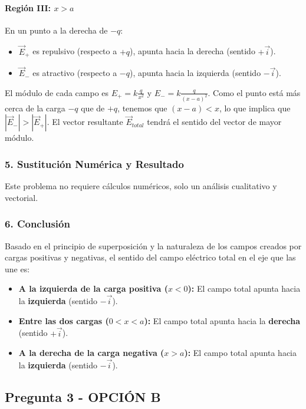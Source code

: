 \paragraph*{Región III: $x > a$}
En un punto a la derecha de $-q$:
\begin{itemize}
    \item $\vec{E}_+$ es repulsivo (respecto a $+q$), apunta hacia la derecha (sentido $+\vec{i}$).
    \item $\vec{E}_-$ es atractivo (respecto a $-q$), apunta hacia la izquierda (sentido $-\vec{i}$).
\end{itemize}
El módulo de cada campo es $E_+ = k\frac{q}{x^2}$ y $E_- = k\frac{q}{(x-a)^2}$. Como el punto está más cerca de la carga $-q$ que de $+q$, tenemos que $(x-a) < x$, lo que implica que $|\vec{E}_-| > |\vec{E}_+|$. El vector resultante $\vec{E}_{total}$ tendrá el sentido del vector de mayor módulo.

\subsubsection*{5. Sustitución Numérica y Resultado}
Este problema no requiere cálculos numéricos, solo un análisis cualitativo y vectorial.

\subsubsection*{6. Conclusión}
\begin{cajaconclusion}
Basado en el principio de superposición y la naturaleza de los campos creados por cargas positivas y negativas, el sentido del campo eléctrico total en el eje que las une es:
\begin{itemize}
    \item \textbf{A la izquierda de la carga positiva ($x<0$):} El campo total apunta hacia la \textbf{izquierda} (sentido $-\vec{i}$).
    \item \textbf{Entre las dos cargas ($0<x<a$):} El campo total apunta hacia la \textbf{derecha} (sentido $+\vec{i}$).
    \item \textbf{A la derecha de la carga negativa ($x>a$):} El campo total apunta hacia la \textbf{izquierda} (sentido $-\vec{i}$).
\end{itemize}
\end{cajaconclusion}
\newpage

\subsection{Pregunta 3 - OPCIÓN B}
\label{subsec:3B_2025_jun_ord}

